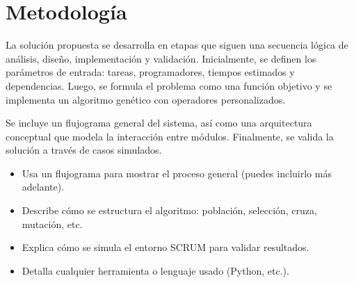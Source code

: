 \section{Metodología}

La solución propuesta se desarrolla en etapas que siguen una secuencia lógica de análisis, diseño, implementación y validación. Inicialmente, se definen los parámetros de entrada: tareas, programadores, tiempos estimados y dependencias. Luego, se formula el problema como una función objetivo y se implementa un algoritmo genético con operadores personalizados.

Se incluye un flujograma general del sistema, así como una arquitectura conceptual que modela la interacción entre módulos. Finalmente, se valida la solución a través de casos simulados.

\vspace{0.5cm}

\begin{tcolorbox}[colback=gray!10, colframe=black!30, title={Sugerencias para esta sección}]
    \begin{itemize}
        \item Usa un flujograma para mostrar el proceso general (puedes incluirlo más adelante).
        \item Describe cómo se estructura el algoritmo: población, selección, cruza, mutación, etc.
        \item Explica cómo se simula el entorno SCRUM para validar resultados.
        \item Detalla cualquier herramienta o lenguaje usado (Python, etc.).
    \end{itemize}
\end{tcolorbox}